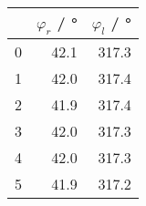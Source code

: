 \begin{tabular}{lrr}
\toprule
{} &  $\varphi_r$ / \si{\degree} &  $\varphi_l$ / \si{\degree} \\
\midrule
0 &                        42.1 &                       317.3 \\
1 &                        42.0 &                       317.4 \\
2 &                        41.9 &                       317.4 \\
3 &                        42.0 &                       317.3 \\
4 &                        42.0 &                       317.3 \\
5 &                        41.9 &                       317.2 \\
\bottomrule
\end{tabular}
